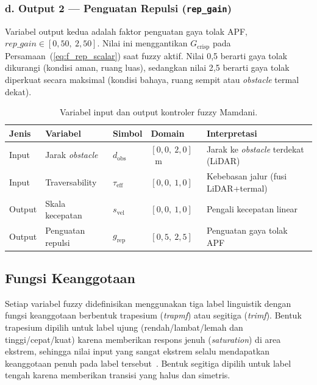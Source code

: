 \subsubsection*{d. Output 2 --- Penguatan Repulsi (\texttt{rep\_gain})}

Variabel output kedua adalah faktor penguatan gaya tolak APF, $\mathit{rep\_gain} \in [0{,}50,\ 2{,}50]$. Nilai ini menggantikan $G_\text{crisp}$ pada Persamaan~(\ref{eq:f_rep_scalar}) saat fuzzy aktif. Nilai 0,5 berarti gaya tolak dikurangi (kondisi aman, ruang luas), sedangkan nilai 2,5 berarti gaya tolak diperkuat secara maksimal (kondisi bahaya, ruang sempit atau \textit{obstacle} termal dekat).

\begin{table}[H]
\centering
\caption{Variabel input dan output kontroler fuzzy Mamdani.}
\label{tab:fuzzy_var}
\begin{tabular}{llllp{4.5cm}}
\toprule
\textbf{Jenis} & \textbf{Variabel} & \textbf{Simbol} & \textbf{Domain} & \textbf{Interpretasi} \\
\midrule
Input  & Jarak \textit{obstacle}     & $d_\text{obs}$       & $[0{,}0,\ 2{,}0]$~m & Jarak ke \textit{obstacle} terdekat (LiDAR) \\
Input  & Traversability     & $\tau_\text{eff}$    & $[0{,}0,\ 1{,}0]$   & Kebebasan jalur (fusi LiDAR+termal) \\
Output & Skala kecepatan    & $s_\text{vel}$       & $[0{,}0,\ 1{,}0]$   & Pengali kecepatan linear \\
Output & Penguatan repulsi  & $g_\text{rep}$       & $[0{,}5,\ 2{,}5]$   & Penguatan gaya tolak APF \\
\bottomrule
\end{tabular}
\end{table}

\subsection{Fungsi Keanggotaan}
\label{sec:fuzzy_mf}

Setiap variabel fuzzy didefinisikan menggunakan tiga label linguistik dengan fungsi keanggotaan berbentuk trapesium (\textit{trapmf}) atau segitiga (\textit{trimf}). Bentuk trapesium dipilih untuk label ujung (rendah/lambat/lemah dan tinggi/cepat/kuat) karena memberikan respons jenuh (\textit{saturation}) di area ekstrem, sehingga nilai input yang sangat ekstrem selalu mendapatkan keanggotaan penuh pada label tersebut~\cite{Benaicha2026}. Bentuk segitiga dipilih untuk label tengah karena memberikan transisi yang halus dan simetris.

